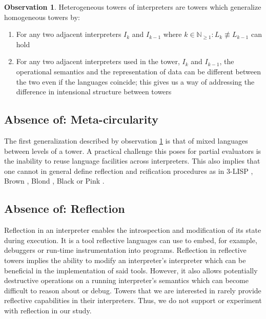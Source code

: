 \documentclass[sigplan,anonymous,review]{acmart}
\theoremstyle{definition}
\newtheorem{observation}{Observation}[section]
\begin{document}
\begin{observation}
    \label{def:het}
	Heterogeneous towers of interpreters are towers which generalize homogeneous towers by:
	\begin{enumerate}
		\item For any two adjacent interpreters $I_k$ and $I_{k-1}$ where $k \in \mathbb N_{\ge 1}: L_k \not\equiv L_{k-1}$ can hold
		\item For any two adjacent interpreters used in the tower, $I_{k}$ and $I_{k-1}$, the operational semantics and the representation of data can be different between the two even if the languages coincide; this gives us a way of addressing the difference in intensional structure between towers
	\end{enumerate}
\end{observation}

\subsection{Absence of: Meta-circularity}
The first generalization described by observation \ref{def:het} is that of mixed languages between levels of a tower. A practical challenge this poses for partial evaluators is the inability to reuse language facilities across interpreters. This also implies that one cannot in general define reflection and reification procedures as in 3-LISP \cite{smith1984reflection}, Brown \cite{wand1988mystery}, Blond \cite{danvy1988intensions}, Black \cite{asai1996duplication} or Pink \cite{amin2017collapsing}.

\subsection{Absence of: Reflection}
Reflection in an interpreter enables the introspection and modification of its state during execution. It is a tool reflective languages can use to embed, for example, debuggers or run-time instrumentation into programs. Reflection in reflective towers implies the ability to modify an interpreter's interpreter which can be beneficial in the implementation of said tools. However, it also allows potentially destructive operations on a running interpreter's semantics which can become difficult to reason about or debug. Towers that we are interested in rarely provide reflective capabilities in their interpreters. Thus, we do not support or experiment with reflection in our study.
\end{document}
